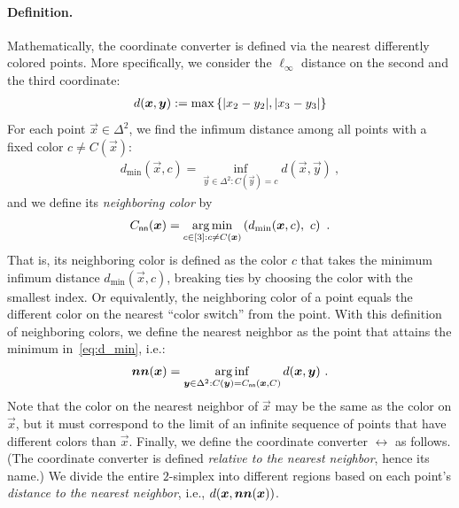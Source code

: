 \paragraph{Definition.} 
Mathematically, the coordinate converter is defined via the nearest differently colored points. 
More specifically, we consider the $\ell_\infty$ distance on the second and the third coordinate:
\begin{align}
    \label{eqn:modified-distance}
    d(\boldsymbol{x}, \boldsymbol{y}) := \max\left \{{|x_2-y_2|, |x_3-y_3|} \right \}
\end{align} 
For each point $\vec{x}\in \Delta^2$, we find the infimum distance among all points with a fixed color $c\neq C(\vec{x})$: 
\begin{align}\label{eq:d_min}
    d_{\min}(\vec{x}, c) = \inf_{\vec{y}\in \Delta^2: C(\vec{y})=c} 
    d(\vec{x}, \vec{y})
    ~,
\end{align}
and we define its {\em neighboring color} by 
\begin{align}
    \label{eqn:cnn}
    C_{\sf nn}(\boldsymbol{x}) = \operatorname*{arg\,min}_{c\in [3]:c\neq C(\boldsymbol{x})} \left(d_{\min}(\boldsymbol{x}, c),\ c\right)~.
\end{align}
That is, its neighboring color is defined as the color $c$ that takes the minimum infimum distance $d_{\min}(\vec{x}, c)$, breaking ties by choosing the color with the smallest index.
Or equivalently, the neighboring color of a point equals the different color on the nearest ``color switch'' from the point. 
With this definition of neighboring colors, we define the {\rm nearest neighbor} as the point that attains the minimum in~\cref{eq:d_min}, i.e.:
\begin{align}
    \label{eqn:nn}
    \operatorname*{\boldsymbol{nn}}(\boldsymbol{x}) = \operatorname*{arg\,inf}_{\boldsymbol{y}\in \Delta^2: C(\boldsymbol{y})=C_{\sf nn}(\boldsymbol{x},C)} d(\boldsymbol{x}, \boldsymbol{y})~.
\end{align}
Note that the color on the nearest neighbor of $\vec{x}$ may be the same as the color on $\vec{x}$, but it must correspond to the limit of an infinite sequence of points that have different colors than $\vec{x}$.
Finally, we define the coordinate converter $\rel$ 
as follows. (The coordinate converter is defined {\em relative to the nearest neighbor}, hence its name.)
We divide the entire $2$-simplex into different regions based on each point's {\em distance to the nearest neighbor}, i.e., $d(\boldsymbol{x}, \operatorname*{\boldsymbol{nn}}(\boldsymbol{x}))$.
